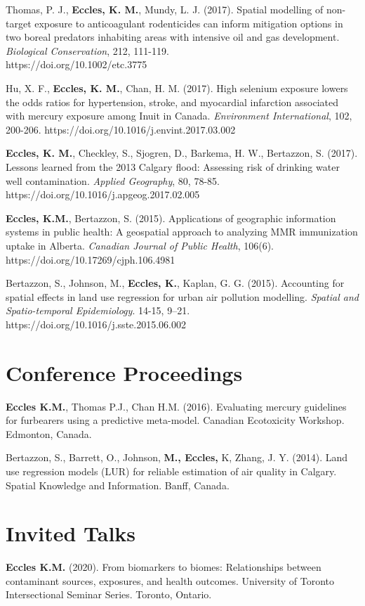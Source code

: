 \documentclass[margin,line]{res}
\begin{document}
\begin{resume}
Thomas, P. J., \textbf{Eccles, K. M.}, Mundy, L. J. (2017). Spatial modelling of non-target exposure to anticoagulant rodenticides can inform mitigation options in two boreal predators inhabiting areas with intensive oil and gas development. \textit{Biological Conservation}, 212, 111-119. \\https://doi.org/10.1002/etc.3775

Hu, X. F., \textbf{Eccles, K. M.}, Chan, H. M. (2017). High selenium exposure lowers the odds ratios for hypertension, stroke, and myocardial infarction associated with mercury exposure among Inuit in Canada. \textit{Environment International}, 102, 200-206. https://doi.org/10.1016/j.envint.2017.03.002

\textbf{Eccles, K. M.}, Checkley, S., Sjogren, D., Barkema, H. W., Bertazzon, S. (2017). Lessons learned from the 2013 Calgary flood: Assessing risk of drinking water well contamination. \textit{Applied Geography}, 80, 78-85. https://doi.org/10.1016/j.apgeog.2017.02.005

\textbf{Eccles, K.M.}, Bertazzon, S. (2015). Applications of geographic information systems in public health: A geospatial approach to analyzing MMR immunization uptake in Alberta. \textit{Canadian Journal of Public Health}, 106(6). https://doi.org/10.17269/cjph.106.4981

Bertazzon, S., Johnson, M., \textbf{Eccles, K.}, Kaplan, G. G. (2015). Accounting for spatial effects in land use regression for urban air pollution modelling. \textit{Spatial and Spatio-temporal Epidemiology}. 14-15, 9–21. https://doi.org/10.1016/j.sste.2015.06.002

\vspace*{.1in}
\section{\sc Conference Proceedings}
\textbf{Eccles K.M.}, Thomas P.J., Chan H.M. (2016). Evaluating mercury guidelines for furbearers using a predictive meta-model. Canadian Ecotoxicity Workshop. Edmonton, Canada.

Bertazzon, S., Barrett, O., Johnson, \textbf{M., Eccles,} K, Zhang, J. Y. (2014). Land use regression models (LUR) for reliable estimation of air quality in Calgary. Spatial Knowledge and Information. Banff, Canada.\\

\vspace*{.1in}
\section{\sc Invited Talks}
\textbf{Eccles K.M. }(2020). From biomarkers to biomes: Relationships between contaminant sources, exposures, and health outcomes. University of Toronto Intersectional Seminar Series. Toronto, Ontario.


\end{resume}
\end{document}
